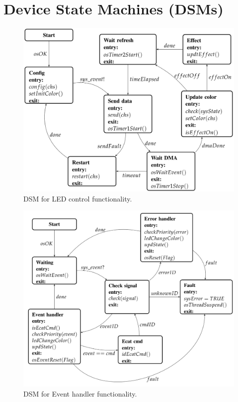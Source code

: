 \chapter{Device State Machines (DSMs)}\label{cha:state_machines}
\begin{figure}[h]
    \centering
    \includegraphics[width=\textwidth]{imgs/dsm_led.png}
    \caption{DSM for LED control functionality.}
    \label{fig:dsm_led}
\end{figure}
\begin{figure}[h]
    \centering
    \includegraphics[width=\textwidth]{imgs/dsm_event.png}
    \caption{DSM for Event handler functionality.}
    \label{fig:dsm_event}
\end{figure}
